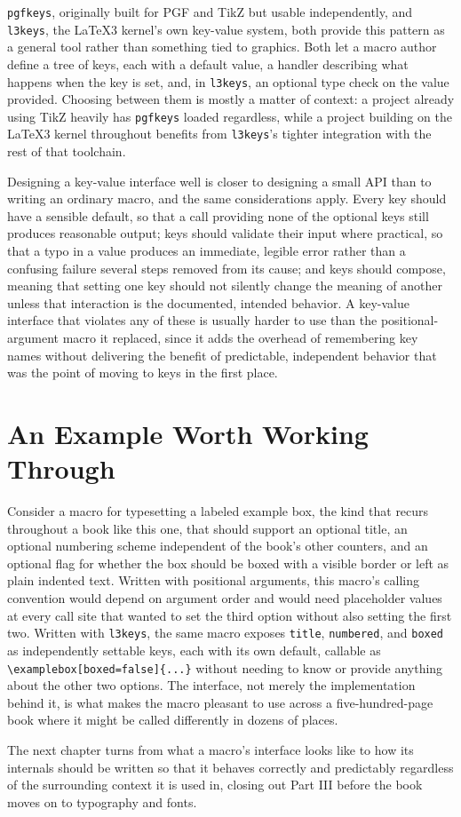 \texttt{pgfkeys}, originally built for PGF and TikZ but usable independently, and \texttt{l3keys}, the LaTeX3 kernel's own key-value system, both provide this pattern as a general tool rather than something tied to graphics. Both let a macro author define a tree of keys, each with a default value, a handler describing what happens when the key is set, and, in \texttt{l3keys}, an optional type check on the value provided. Choosing between them is mostly a matter of context: a project already using TikZ heavily has \texttt{pgfkeys} loaded regardless, while a project building on the LaTeX3 kernel throughout benefits from \texttt{l3keys}'s tighter integration with the rest of that toolchain.

Designing a key-value interface well is closer to designing a small API than to writing an ordinary macro, and the same considerations apply. Every key should have a sensible default, so that a call providing none of the optional keys still produces reasonable output; keys should validate their input where practical, so that a typo in a value produces an immediate, legible error rather than a confusing failure several steps removed from its cause; and keys should compose, meaning that setting one key should not silently change the meaning of another unless that interaction is the documented, intended behavior. A key-value interface that violates any of these is usually harder to use than the positional-argument macro it replaced, since it adds the overhead of remembering key names without delivering the benefit of predictable, independent behavior that was the point of moving to keys in the first place.

\hypertarget{an-example-worth-working-through}{%
\section{An Example Worth Working Through}\label{an-example-worth-working-through}}

Consider a macro for typesetting a labeled example box, the kind that recurs throughout a book like this one, that should support an optional title, an optional numbering scheme independent of the book's other counters, and an optional flag for whether the box should be boxed with a visible border or left as plain indented text. Written with positional arguments, this macro's calling convention would depend on argument order and would need placeholder values at every call site that wanted to set the third option without also setting the first two. Written with \texttt{l3keys}, the same macro exposes \texttt{title}, \texttt{numbered}, and \texttt{boxed} as independently settable keys, each with its own default, callable as \texttt{\textbackslash{}examplebox{[}boxed=false{]}\{...\}} without needing to know or provide anything about the other two options. The interface, not merely the implementation behind it, is what makes the macro pleasant to use across a five-hundred-page book where it might be called differently in dozens of places.

The next chapter turns from what a macro's interface looks like to how its internals should be written so that it behaves correctly and predictably regardless of the surrounding context it is used in, closing out Part III before the book moves on to typography and fonts.
